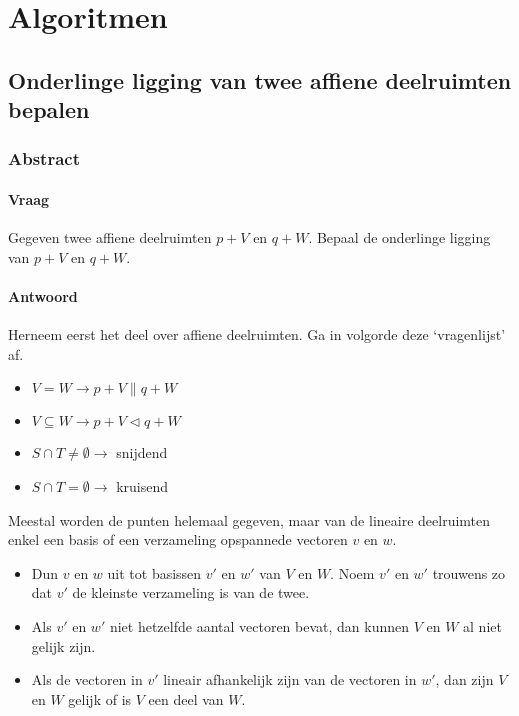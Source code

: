 \documentclass[main.tex]{subfiles}
\begin{document}
\chapter{Algoritmen}
\label{cha:algoritmen}

\section{Onderlinge ligging van twee affiene deelruimten bepalen}
\subsection{Abstract}
\subsubsection{Vraag}

\begin{center}
  Gegeven twee affiene deelruimten $p+V$ en $q+W$.
  Bepaal de onderlinge ligging van $p+V$ en $q+W$.
\end{center}

\subsubsection{Antwoord}
Herneem eerst het deel over affiene deelruimten.
Ga in volgorde deze `vragenlijst' af.
\begin{itemize}
\item $V = W \rightarrow p+V \parallel q+W$
\item $V \subseteq W \rightarrow p+V \triangleleft q+W$
\item $S \cap T \neq \emptyset \rightarrow $ snijdend
\item $S \cap T = \emptyset \rightarrow $ kruisend
\end{itemize}

Meestal worden de punten helemaal gegeven, maar van de lineaire deelruimten enkel een basis of een verzameling opspannede vectoren $v$ en $w$.

\begin{itemize}
\item Dun $v$ en $w$ uit tot basissen $v'$ en $w'$ van $V$ en $W$.
  Noem $v'$ en $w'$ trouwens zo dat $v'$ de kleinste verzameling is van de twee.
\item Als $v'$ en $w'$ niet hetzelfde aantal vectoren bevat, dan kunnen $V$ en $W$ al niet gelijk zijn.
\item Als de vectoren in $v'$ lineair afhankelijk zijn van de vectoren in $w'$, dan zijn $V$ en $W$ gelijk of is $V$ een deel van $W$.
\end{itemize}
\end{document}
